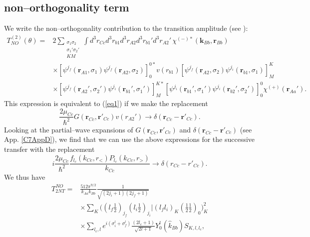 \subsection{non--orthogonality term}\label{S6.2.9}
We write the non--orthogonality contribution to the transition amplitude (see \cite{Bayman:82}):
\begin{equation}\label{129}
 \begin{split}
T_{NO}^{(2)}(\theta)=&2\sum_{\substack{\sigma_1 \sigma_2 \\ \sigma_1' \sigma_2' \\ KM}}\int d^3r_{Cc}d^3r_{b1}d^3r_{A2}
d^3r_{b1}'d^3r_{A2}' \,\chi^{(-)*}(\mathbf{k}_{Bb},\mathbf{r}_{Bb})\\
 & \times \left[ \psi ^{j_f} (\mathbf{r}_{A1},\sigma_1) \psi ^{j_f} (\mathbf{r}_{A2},\sigma_2) \right] _0^{0*} v(r_{b1})
\left[ \psi ^{j_f} (\mathbf{r}_{A2},\sigma_2) \psi ^{j_i} (\mathbf{r}_{b1},\sigma_1) \right] _M^{K}\\
& \times
\left[ \psi ^{j_f} (\mathbf{r}_{A2}',\sigma_2') \psi ^{j_i} (\mathbf{r}_{b1}',\sigma_1') \right] _M^{K*} \left[ \psi ^{j_i} (\mathbf{r}_{b1}',\sigma_1') \psi ^{j_i} (\mathbf{r}_{b2}',\sigma_2') \right] _0^{0}
\chi^{(+)}( \mathbf{r}_{Aa}').
 \end{split}
\end{equation}
This expression is equivalent to (\ref{eq1}) if we make the replacement
\begin{equation}\label{eq136}
    \frac{2\mu_{Cc}}{\hbar^2}G(\mathbf{r}_{Cc},\mathbf{r}'_{Cc})v(r_{A2}')\rightarrow \delta(\mathbf{r}_{Cc}-\mathbf{r}'_{Cc}).
\end{equation}
Looking at the partial--wave expansions of $G(\mathbf{r}_{Cc},\mathbf{r}'_{Cc})$ and $\delta(\mathbf{r}_{Cc}-\mathbf{r}'_{Cc})$ (see App. \ref{C7AppD}), we find that we can use the above expressions for the successive transfer with the replacement
\begin{equation}\label{eq137}
    i\frac{2\mu_{Cc}}{\hbar^2}\frac{f_{l_c}(k_{Cc},r_<)P_{l_c}(k_{Cc},r_>)}{k_{Cc}}\rightarrow \delta(r_{Cc}-r'_{Cc}).
\end{equation}
We thus have
\begin{equation}\label{eq138}
 \begin{split}
T_{2NT}^{NO}=&\frac{512\pi^{9/2}}{ k_{Aa}k_{Bb}}\frac{1}{\sqrt{(2j_i+1)(2j_f+1)}}\\
&\times \sum_{K}
\bigl ( (l_f \tfrac{1}{2})_{j_f} (l_i \tfrac{1}{2})_{j_i} |(l_f l_i)_K (\tfrac{1}{2} \tfrac{1}{2})_0 \bigr )_K ^2\\
&\times \sum_{l_c,l}e^{i(\sigma _i^l+\sigma _f^{l})}\frac{(2l_c+1)}{\sqrt{2l+1}} Y_0^l(\hat k_{Bb})S_{K,l,l_c},
 \end{split}
\end{equation}

